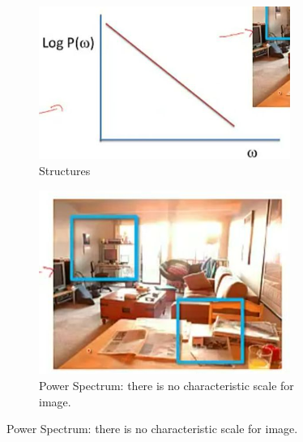 \documentclass[]{article}
\begin{document}
\begin{figure}[H]
	\begin{center}
		\caption[Power Law]{Power Law: there are similar structures at very different length scales.}
		\begin{subfigure}[b]{0.45\textwidth}
			\caption{Structures}
			\includegraphics[width=0.9\textwidth]{power-law-graph}
		\end{subfigure}
		\begin{subfigure}[b]{0.45\textwidth}
			\caption{Power Spectrum: there is no characteristic scale for image.}
			\includegraphics[width=0.9\textwidth]{power-law-shapes}
		\end{subfigure}
	\end{center}
\end{figure}
\end{document}
